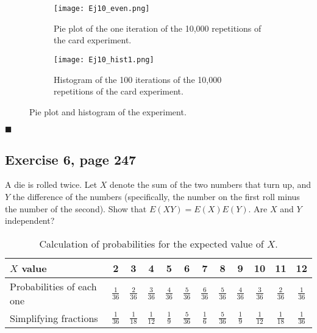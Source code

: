 \documentclass{article}
\begin{document}
\begin{figure}[]
\begin{subfigure}{.48\textwidth}
  \centering
  \texttt{[image: Ej10\_even.png]}  
  \caption{Pie plot of the one iteration of the 10,000 repetitions of the card experiment. }
  \label{sb1-1}
\end{subfigure}\hspace{5mm}%
\begin{subfigure}{.48\textwidth}
  \centering
  \texttt{[image: Ej10\_hist1.png]}  
  \caption{Histogram of the 100 iterations of the 10,000 repetitions of the card experiment.}
  \label{sb1-2}
\end{subfigure}
	\caption{Pie plot and histogram of the experiment.}
\label{fig1}
\end{figure}


\begin{flushright}
$\blacksquare$
\end{flushright}

\subsection{Exercise 6, page 247}\label{ex2}

A die is rolled twice. Let $X$ denote the sum of the two numbers that turn up, and $Y$ the difference of the numbers (specifically, the number on the first roll minus the number of the second). Show that $E(XY) = E(X)E(Y)$. Are $X$ and $Y$ independent?\\

 \begin{table}[]\caption{Calculation of probabilities for the expected value of $X$.}\label{tab1}
\centering
\begin{tabular}{| p{2cm} | c | c | c | c | c | c | c | c | c | c | c |}
\hline
$X$ value & 2 & 3 & 4 & 5 & 6 & 7 & 8 & 9 & 10 & 11 & 12 \\
\hline 
Probabilities of each one & $\frac{1}{36}$& $\frac{2}{36}$& $\frac{3}{36}$& $\frac{4}{36}$& $\frac{5}{36}$& $\frac{6}{36}$& $\frac{5}{36}$& $\frac{4}{36}$& $\frac{3}{36}$& $\frac{2}{36}$& $\frac{1}{36}$\\
\hline 
Simplifying fractions& $\frac{1}{36}$& $\frac{1}{18}$& $\frac{1}{12}$& $\frac{1}{9}$& $\frac{5}{36}$& $\frac{1}{6}$& $\frac{5}{36}$& $\frac{1}{9}$& $\frac{1}{12}$& $\frac{1}{18}$& $\frac{1}{36}$\\
\hline
\end{tabular}
\end{table}
\end{document}
